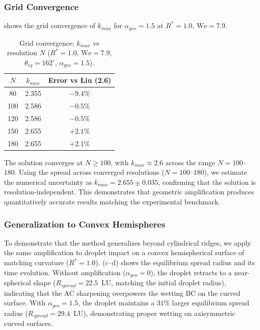 \subsubsection{Grid Convergence}

 shows the grid convergence of $k_{max}$ for $\alpha_{geo}=1.5$ at $R^*=1.0$, $\mathrm{We}=7.9$.

\begin{table}[h]
\centering
\caption{Grid convergence: $k_{max}$ vs resolution $N$ ($R^*=1.0$, $\mathrm{We}=7.9$, $\theta_{eq}=162^\circ$, $\alpha_{geo}=1.5$).}
\label{tab:grid_convergence}
\begin{tabular}{c|c|c}
\hline
$N$ & $k_{max}$ & Error vs Liu (2.6) \\
\hline
80  & 2.355 & $-9.4\%$ \\
100 & 2.586 & $-0.5\%$ \\
120 & 2.586 & $-0.5\%$ \\
150 & 2.655 & $+2.1\%$ \\
180 & 2.655 & $+2.1\%$ \\
\hline
\end{tabular}
\end{table}

The solution converges at $N \geq 100$, with $k_{max} \approx 2.6$ across the range $N=100$--$180$. Using the spread across converged resolutions ($N=100$--$180$), we estimate the numerical uncertainty as $k_{max} = 2.655 \pm 0.035$, confirming that the solution is resolution-independent. This demonstrates that geometric amplification produces quantitatively accurate results matching the experimental benchmark.

\subsubsection{Generalization to Convex Hemispheres}

To demonstrate that the method generalizes beyond cylindrical ridges, we apply the same amplification to droplet impact on a convex hemispherical surface of matching curvature ($R^*=1.0$). (c--d) shows the equilibrium spread radius and its time evolution. Without amplification ($\alpha_{geo}=0$), the droplet retracts to a near-spherical shape ($R_{spread}=22.5$~LU, matching the initial droplet radius), indicating that the AC sharpening overpowers the wetting BC on the curved surface. With $\alpha_{geo}=1.5$, the droplet maintains a $31\%$ larger equilibrium spread radius ($R_{spread}=29.4$~LU), demonstrating proper wetting on axisymmetric curved surfaces.


